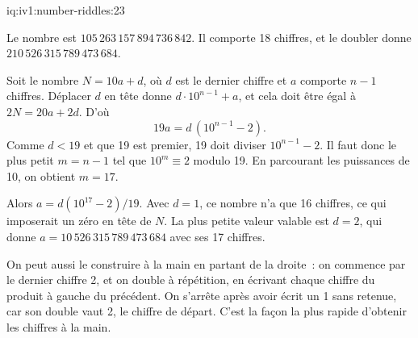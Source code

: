 \begin{solution}{iq:iv1:number-riddles:23}
\begin{sloppypar}Le nombre est $105\,263\,157\,894\,736\,842$. Il comporte 18 chiffres, et le doubler donne $210\,526\,315\,789\,473\,684$.\end{sloppypar}

Soit le nombre $N = 10a + d$, où $d$ est le dernier chiffre et $a$ comporte $n - 1$ chiffres. Déplacer $d$ en tête donne $d \cdot 10^{n-1} + a$, et cela doit être égal à $2N = 20a + 2d$. D'où
\[
19a = d \,(10^{n-1} - 2).
\]
Comme $d < 19$ et que 19 est premier, 19 doit diviser $10^{n-1} - 2$. Il faut donc le plus petit $m = n - 1$ tel que $10^m \equiv 2$ modulo 19. En parcourant les puissances de 10, on obtient $m = 17$.

Alors $a = d(10^{17} - 2)/19$. Avec $d = 1$, ce nombre n'a que 16 chiffres, ce qui imposerait un zéro en tête de $N$. La plus petite valeur valable est $d = 2$, qui donne $a = 10\,526\,315\,789\,473\,684$ avec ses 17 chiffres.

On peut aussi le construire à la main en partant de la droite~: on commence par le dernier chiffre 2, et on double à répétition, en écrivant chaque chiffre du produit à gauche du précédent. On s'arrête après avoir écrit un 1 sans retenue, car son double vaut 2, le chiffre de départ. C'est la façon la plus rapide d'obtenir les chiffres à la main.

\end{solution}

